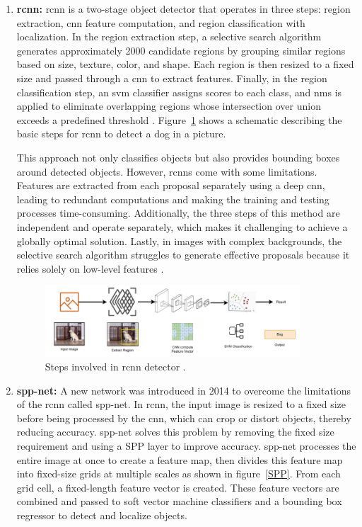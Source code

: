 \begin{enumerate}
    \item \textbf{\gls{rcnn}:} \gls{rcnn} is a two-stage object detector that operates in three steps: region extraction, \gls{cnn} feature computation, and region classification with localization. In the region extraction step, a selective search algorithm generates approximately 2000 candidate regions by grouping similar regions based on size, texture, color, and shape. Each region is then resized to a fixed size and passed through a \gls{cnn} to extract features. Finally, in the region classification step, an \gls{svm} classifier assigns scores to each class, and \gls{nms} is applied to eliminate overlapping regions whose intersection over union exceeds a predefined threshold \cite{oD_Review}. Figure~\ref{RCNN} shows a schematic describing the basic steps for \gls{rcnn} to detect a dog in a picture.

    This approach not only classifies objects but also provides bounding boxes around detected objects. However, \gls{rcnn}s come with some limitations. Features are extracted from each proposal separately using a deep \gls{cnn}, leading to redundant computations and making the training and testing processes time-consuming. Additionally, the three steps of this method are independent and operate separately, which makes it challenging to achieve a globally optimal solution. Lastly, in images with complex backgrounds, the selective search algorithm struggles to generate effective proposals because it relies solely on low-level features \cite{oD_Review}.
    
    \begin{figure}[ht]
        \centering
        \includegraphics[width=0.9\textwidth]{Figures/RCNN.PNG} 
        \caption{Steps involved in \gls{rcnn} detector \cite{oD_Review}.}
        \label{RCNN}
    \end{figure}
    
    \item \textbf{\gls{spp-net}:} A new network was introduced in 2014 to overcome the limitations of the \gls{rcnn} called \gls{spp-net}. In \gls{rcnn}, the input image is resized to a fixed size before being processed by the \gls{cnn}, which can crop or distort objects, thereby reducing accuracy. \gls{spp-net} solves this problem by removing the fixed size requirement and using a SPP layer to improve accuracy. \gls{spp-net} processes the entire image at once to create a feature map, then divides this feature map into fixed-size grids at multiple scales as shown in figure~\ref{SPP}. From each grid cell, a fixed-length feature vector is created. These feature vectors are combined and passed to soft vector machine classifiers and a bounding box regressor to detect and localize objects. 
    

\end{enumerate}
